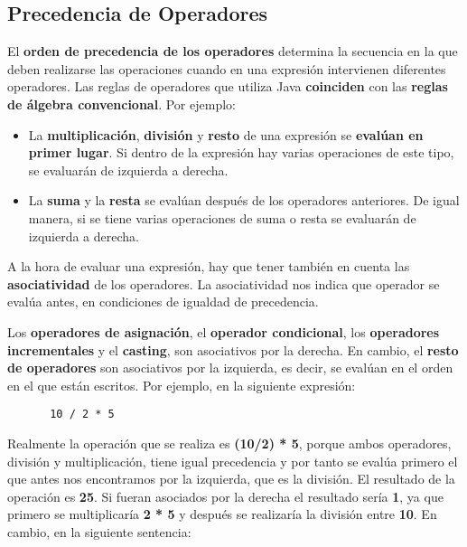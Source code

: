 \subsection{Precedencia de Operadores}
El \textbf{orden de precedencia de los operadores} determina la secuencia en la que deben realizarse las operaciones cuando en una expresión intervienen diferentes operadores. Las reglas de operadores que utiliza Java \textbf{coinciden} con las \textbf{reglas de álgebra convencional}. Por ejemplo:

\begin{itemize}
    \item La \textbf{multiplicación}, \textbf{división} y \textbf{resto} de una expresión se \textbf{evalúan en primer lugar}. Si dentro de la expresión hay varias operaciones de este tipo, se evaluarán de izquierda a derecha.
    \item La \textbf{suma} y la \textbf{resta} se evalúan después de los operadores anteriores. De igual manera, si se tiene varias operaciones de suma o resta se evaluarán de izquierda a derecha.
\end{itemize}

A la hora de evaluar una expresión, hay que tener también en cuenta las \textbf{asociatividad} de los operadores. La asociatividad nos indica que operador se evalúa antes, en condiciones de igualdad de precedencia.

Los \textbf{operadores de asignación}, el \textbf{operador condicional}, los \textbf{operadores incrementales} y el \textbf{casting}, son asociativos por la derecha. En cambio, el \textbf{resto de operadores} son asociativos por la izquierda, es decir, se evalúan en el orden en el que están escritos. Por ejemplo, en la siguiente expresión:

\begin{figure}[H]
    \begin{tcolorbox}[sharp corners, colback=yellow!30, colframe=white!20]
        \scriptsize
\begin{verbatim}
 10 / 2 * 5
\end{verbatim}
    \end{tcolorbox}
\end{figure}

Realmente la operación que se realiza es \textbf{(10/2) * 5}, porque ambos operadores, división y multiplicación, tiene igual precedencia y por tanto se evalúa primero el que antes nos encontramos por la izquierda, que es la división. El resultado de la operación es \textbf{25}. Si fueran asociados por la derecha el resultado sería \textbf{1}, ya que primero se multiplicaría \textbf{2 * 5} y después se realizaría la división entre \textbf{10}. En cambio, en la siguiente sentencia:

